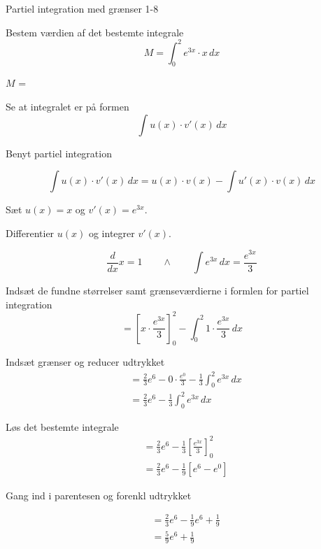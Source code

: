 \documentclass{article}
\begin{document}
\newpage

\begin{exercise}{Partiel integration med grænser 1-8}
	
	
	Bestem værdien af det bestemte integrale
	\[
	M = \int_0^2 e^{3x} \cdot x \, dx
	\]
	
	$M$ =  
	
	
	\hint
	
	Se at integralet er på formen
	\[
	\int u(x) \cdot v'(x) \, dx
	\]
	
	\hint
	
	Benyt partiel integration
	
	\hint
	\[
	\int u(x) \cdot v'(x)\, dx = u(x) \cdot v(x) - \int u'(x) \cdot v(x) \, dx
	\]
	\hint
	
	Sæt $u(x) = x$ og $v'(x) = e^{3x}$.
	
	
	\hint
	
	Differentier $u(x)$ og integrer $v'(x)$.
	
	\hint
	\[
	\frac{d}{dx}x = 1 \qquad \wedge \qquad \int e^{3x} \, dx = \frac{e^{3x}}{3}
	\]
	
	\hint
	
	Indsæt de fundne størrelser samt grænseværdierne i formlen for partiel integration 
	\[
	= \left[x \cdot \frac{e^{3x}}{3}\right]_{0}^{2} - \int_{0}^{2} 1 \cdot \frac{e^{3x}}{3} \, dx
	\]
	
	\hint
	
	Indsæt grænser og reducer udtrykket
	\begin{align*}
	&= \frac{2}{3} e^6 - 0 \cdot \frac{e^0}{3}  -  \frac{1}{3} \int_{0}^{2} e^{3x} \, dx \\
	&= \frac{2}{3} e^6 - \frac{1}{3} \int_{0}^{2} e^{3x} \, dx 
	\end{align*}
	
	\hint
	Løs det bestemte integrale
	\begin{align*}
	&= \frac{2}{3} e^6 - \frac{1}{3} \left[\frac{e^{3x}}{3} \right]_0^2  \\
	&= \frac{2}{3} e^6 - \frac{1}{9} \left[e^{6}-e^0\right] 
	\end{align*}
	
	\hint
	Gang ind i parentesen og forenkl udtrykket
	
	\hint
	\begin{align*}
	&= \frac{2}{3} e^6 - \frac{1}{9} e^{6} + \frac{1}{9} \\
	&= \frac{5}{9} e^6 + \frac{1}{9}
	\end{align*}
	
	
	
\end{exercise}
\end{document}
